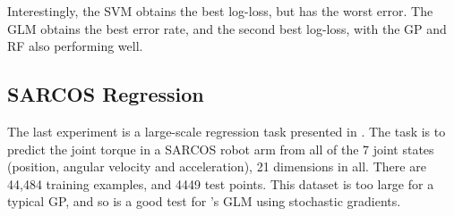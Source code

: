 \documentclass[11pt, oneside]{article}
\begin{document}
Interestingly, the SVM obtains the best log-loss, but has the worst error. The
GLM obtains the best error rate, and the second best log-loss, with the GP and
RF also performing well.


\subsection{SARCOS Regression}

The last experiment is a large-scale regression task presented in
\citet[Chapter 8]{Rasmussen2006}. The task is to predict the joint torque in a
SARCOS robot arm from all of the 7 joint states (position, angular velocity and
acceleration), 21 dimensions in all. There are 44,484 training examples, and
4449 test points. This dataset is too large for a typical GP, and so is a good
test for \revrand{}'s GLM using stochastic gradients.
\end{document}
